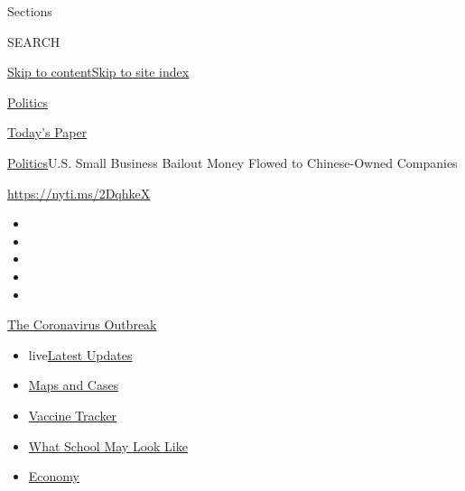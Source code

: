 Sections

SEARCH

\protect\hyperlink{site-content}{Skip to
content}\protect\hyperlink{site-index}{Skip to site index}

\href{https://www.nytimes.com/section/politics}{Politics}

\href{https://myaccount.nytimes.com/auth/login?response_type=cookie\&client_id=vi}{}

\href{https://www.nytimes.com/section/todayspaper}{Today's Paper}

\href{/section/politics}{Politics}\textbar{}U.S. Small Business Bailout
Money Flowed to Chinese-Owned Companies

\url{https://nyti.ms/2DqhkeX}

\begin{itemize}
\item
\item
\item
\item
\item
\end{itemize}

\href{https://www.nytimes.com/news-event/coronavirus?action=click\&pgtype=Article\&state=default\&region=TOP_BANNER\&context=storylines_menu}{The
Coronavirus Outbreak}

\begin{itemize}
\tightlist
\item
  live\href{https://www.nytimes.com/2020/08/02/world/coronavirus-updates.html?action=click\&pgtype=Article\&state=default\&region=TOP_BANNER\&context=storylines_menu}{Latest
  Updates}
\item
  \href{https://www.nytimes.com/interactive/2020/us/coronavirus-us-cases.html?action=click\&pgtype=Article\&state=default\&region=TOP_BANNER\&context=storylines_menu}{Maps
  and Cases}
\item
  \href{https://www.nytimes.com/interactive/2020/science/coronavirus-vaccine-tracker.html?action=click\&pgtype=Article\&state=default\&region=TOP_BANNER\&context=storylines_menu}{Vaccine
  Tracker}
\item
  \href{https://www.nytimes.com/interactive/2020/07/29/us/schools-reopening-coronavirus.html?action=click\&pgtype=Article\&state=default\&region=TOP_BANNER\&context=storylines_menu}{What
  School May Look Like}
\item
  \href{https://www.nytimes.com/live/2020/07/31/business/stock-market-today-coronavirus?action=click\&pgtype=Article\&state=default\&region=TOP_BANNER\&context=storylines_menu}{Economy}
\end{itemize}

